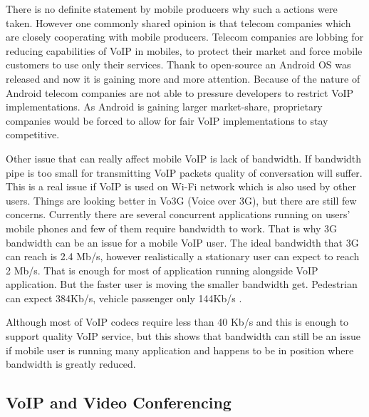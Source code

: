 There is no definite statement by mobile producers why such a actions were taken. However one commonly shared opinion is that telecom companies which are closely cooperating with mobile producers. Telecom companies are lobbing for reducing capabilities of VoIP in mobiles, to protect their market and force mobile customers to use only their services. Thank to open-source an Android OS was released and now it is gaining more and more attention. Because of the nature of Android telecom companies are not able to pressure developers to restrict VoIP implementations. As Android is gaining larger market-share, proprietary companies would be forced to allow for fair VoIP implementations to stay competitive.

Other issue that can really affect mobile VoIP is lack of bandwidth. If bandwidth pipe is too small for transmitting VoIP packets quality of conversation will suffer. This is a real issue if VoIP is used on Wi-Fi network which is also used by other users. Things are looking better in Vo3G (Voice over 3G), but there are still few concerns. Currently there are several concurrent applications running on users' mobile phones and few of them require bandwidth to work. That is why 3G bandwidth can be an issue for a mobile VoIP user. The ideal bandwidth that 3G can reach is 2.4 Mb/s, however realistically a stationary user can expect to reach 2 Mb/s. That is enough for most of application running alongside VoIP application. But the faster user is moving the smaller bandwidth get. Pedestrian can expect 384Kb/s, vehicle passenger only 144Kb/s \cite{website:3g_spec}. 

Although most of VoIP codecs require less than 40 Kb/s and this is enough to support quality VoIP service\cite{website:voip_codecs}, but this shows that bandwidth can still be an issue if mobile user is running many application and happens to be in position where bandwidth is greatly reduced.


\subsection{VoIP and Video Conferencing}
